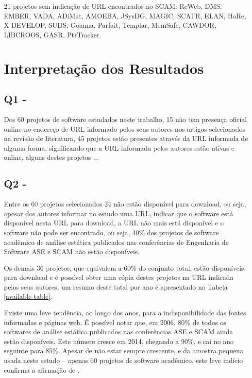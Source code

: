 21 projetos sem indicação de URL encontrados no SCAM:
ReWeb, DMS, EMBER, VADA, ADiMat, AMOEBA, JSysDG, MAGIC, SCATR, ELAN, HaRe,
X-DEVELOP, SUDS, Goanna, Parfait, Templar, MemSafe, CAWDOR, LIBCROOS, GASR,
PtrTracker.

\section{Interpretação dos Resultados} \label{estudo1:interpretacao}

\subsection{Q1 - \EstudoUmQuestaoUm} %

Dos 60 projetos de software estudados neste trabalho, 15 não tem presença
oficial online no endereço de URL informado pelos seus autores nos artigos
selecionados na revisão de literatura, 45 projetos estão presentes através da
URL informada de alguma forma, significando que a URL informada pelos autores
estão ativas e online, alguns destes projetos ...

\subsection{Q2 - \EstudoUmQuestaoDois} %

Entre os 60 projetos selecionados 24 não estão disponível para download, ou
seja, apesar dos autores informar no estudo uma URL, indicar que o software
está disponível nesta URL para download, a URL não mais está disponível e o
software não pode ser encontrado, ou seja, 40\% dos projetos de software
acadêmico de análise estática publicados nas conferências de Engenharia de
Software ASE e SCAM não estão disponíveis.

Os demais 36 projetos, que equivalem a 60\% do conjunto total, estão
disponíveis para download e é possível obter uma cópia destes projetos na URL
indicada pelos seus autores, um resumo deste total por ano é apresentado na
Tabela \ref{available-table}.



Existe uma leve tendência, ao longo dos anos,  para a indisponibilidade das
fontes informadas e páginas web.  É possível notar que, em 2006, 80\% de todos
os softwares de análise estática publicados nas conferências ASE e SCAM ainda
estão disponíveis.  Este número cresce em 2014, chegando a 90\%, e cai no ano
seguinte para 85\%.  Apesar de não estar sempre crescente, e da  amostra
pequena usada neste estudo -- apenas 60 projetos de software acadêmico, este
leve indício confirma a afirmação de .

